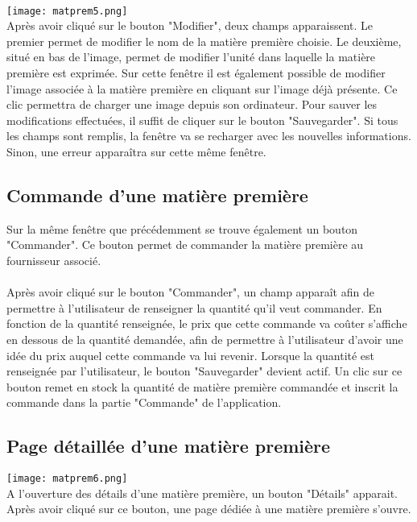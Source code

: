 \paragraph{}
\texttt{[image: matprem5.png]}\\
Après avoir cliqué sur le bouton "Modifier", deux champs apparaissent. Le 
premier permet de modifier le nom de la matière première choisie. Le deuxième, 
situé en bas de l'image, permet de modifier l'unité dans laquelle la matière 
première est exprimée. Sur cette fenêtre il est également possible de modifier 
l'image associée à la matière première en cliquant sur l'image déjà présente. 
Ce clic permettra de charger une image depuis son ordinateur. Pour sauver les 
modifications effectuées, il suffit de cliquer sur le bouton "Sauvegarder". Si 
tous les champs sont remplis, la fenêtre va se recharger avec les nouvelles 
informations. Sinon, une erreur apparaîtra sur cette même fenêtre.

\subsection{Commande d'une matière première}
Sur la même fenêtre que précédemment se trouve également un bouton "Commander". 
Ce bouton permet de commander la matière première au fournisseur associé.

\paragraph{}
Après avoir cliqué sur le bouton "Commander", un champ apparaît afin de 
permettre à l'utilisateur de renseigner la quantité qu'il veut commander. 
En fonction de la quantité renseignée, le prix que cette commande va coûter 
s'affiche en dessous de la quantité demandée, afin de permettre à l'utilisateur 
d'avoir une idée du prix auquel cette commande va lui revenir. Lorsque la 
quantité est renseignée par l'utilisateur, le bouton "Sauvegarder" devient 
actif. Un clic sur ce bouton remet en stock la quantité de matière première 
commandée et inscrit la commande dans la partie "Commande" de l'application.

\subsection{Page détaillée d'une matière première}
\texttt{[image: matprem6.png]}\\
A l'ouverture des détails d'une matière première, un bouton "Détails" apparait. 
Après avoir cliqué sur ce bouton, une page dédiée à une matière première 
s'ouvre. 

